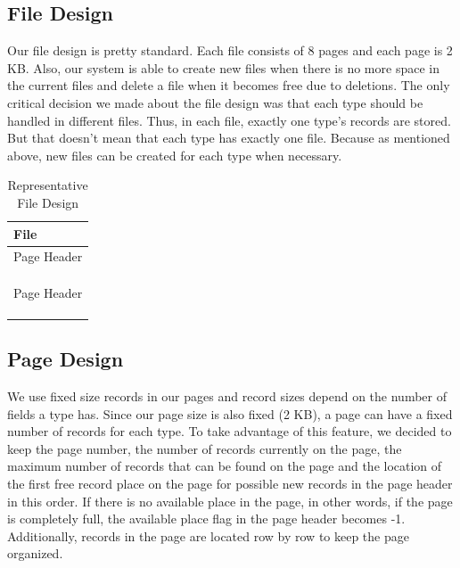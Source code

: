 \documentclass{article}
\begin{document}
\subsection{File Design}
\label{filedesign}
Our file design is pretty standard. Each file consists of 8 pages and each page is 2 KB. Also, our system is able to create new files when there is no more space in the current files and delete a file when it becomes free due to deletions. The only critical decision we made about the file design was that each type should be handled in different files. Thus, in each file, exactly one type's records are stored. But that doesn't mean that each type has exactly one file. Because as mentioned above, new files can be created for each type when necessary.


\begin{table}[H]
\centering
\begin{tabular}{|p{8cm}|}
\hline
\textbf{\hspace{3.5cm} File} \\
\hline
{Page Header}  \\
\hline \\ \\ \\
\hline
{Page Header} \\ 
\hline \\ \\ \\
\hline
\end{tabular}
\label{tab:ex}
\caption{Representative File Design}
\end{table}



\subsection{Page Design}
\label{pagedesign}
We use fixed size records in our pages and record sizes depend on the number of fields a type has. Since our page size is also fixed (2 KB), a page can have a fixed number of records for each type. To take advantage of this feature, we decided to keep the page number, the number of records currently on the page, the maximum number of records that can be found on the page and the location of the first free record place on the page for possible new records in the page header in this order. If there is no available place in the page, in other words, if the page is completely full, the available place flag in the page header becomes -1. Additionally, records in the page are located row by row to keep the page organized. 
\end{document}
